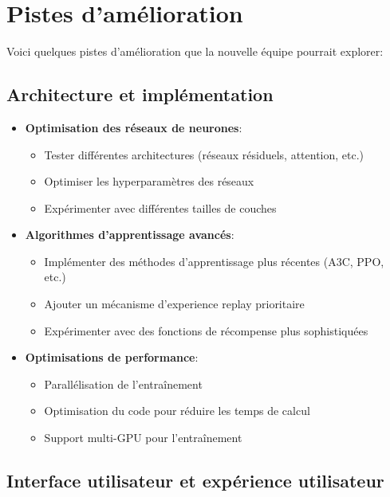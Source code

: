 \documentclass[]{article}
\begin{document}
\section{Pistes d'amélioration}

Voici quelques pistes d'amélioration que la nouvelle équipe pourrait explorer:

\subsection{Architecture et implémentation}

\begin{itemize}
  \item \textbf{Optimisation des réseaux de neurones}:
    \begin{itemize}
      \item Tester différentes architectures (réseaux résiduels, attention, etc.)
      \item Optimiser les hyperparamètres des réseaux
      \item Expérimenter avec différentes tailles de couches
    \end{itemize}

  \item \textbf{Algorithmes d'apprentissage avancés}:
    \begin{itemize}
      \item Implémenter des méthodes d'apprentissage plus récentes (A3C, PPO, etc.)
      \item Ajouter un mécanisme d'experience replay prioritaire
      \item Expérimenter avec des fonctions de récompense plus sophistiquées
    \end{itemize}

  \item \textbf{Optimisations de performance}:
    \begin{itemize}
      \item Parallélisation de l'entraînement
      \item Optimisation du code pour réduire les temps de calcul
      \item Support multi-GPU pour l'entraînement
    \end{itemize}
\end{itemize}

\subsection{Interface utilisateur et expérience utilisateur}
\end{document}
